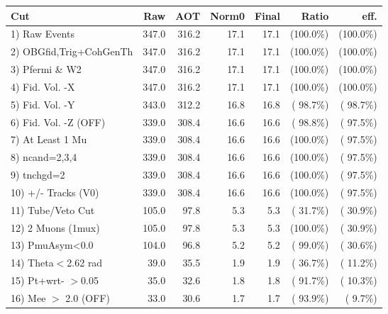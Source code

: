  \begin{table}[h!]\centering
 \begin{tabular}{||l||r|r|r|r|r|r||}
 \hline
 \hline
 Cut & Raw & AOT & Norm0 & Final & Ratio & eff.       \\
 \hline
  1) Raw Events           &        347.0 &        316.2 &         17.1 &         17.1 & (100.0\%) & (100.0\%) \\
  2) OBGfid,Trig+CohGenTh &        347.0 &        316.2 &         17.1 &         17.1 & (100.0\%) & (100.0\%) \\
  3) Pfermi \& W2         &        347.0 &        316.2 &         17.1 &         17.1 & (100.0\%) & (100.0\%) \\
  4) Fid. Vol. -X         &        347.0 &        316.2 &         17.1 &         17.1 & (100.0\%) & (100.0\%) \\
  5) Fid. Vol. -Y         &        343.0 &        312.2 &         16.8 &         16.8 & ( 98.7\%) & ( 98.7\%) \\
  6) Fid. Vol. -Z (OFF)   &        339.0 &        308.4 &         16.6 &         16.6 & ( 98.8\%) & ( 97.5\%) \\
  7) At Least 1 Mu        &        339.0 &        308.4 &         16.6 &         16.6 & (100.0\%) & ( 97.5\%) \\
  8) ncand=2,3,4          &        339.0 &        308.4 &         16.6 &         16.6 & (100.0\%) & ( 97.5\%) \\
  9) tnchgd=2             &        339.0 &        308.4 &         16.6 &         16.6 & (100.0\%) & ( 97.5\%) \\
 10) +/- Tracks (V0)      &        339.0 &        308.4 &         16.6 &         16.6 & (100.0\%) & ( 97.5\%) \\
 11) Tube/Veto Cut        &        105.0 &         97.8 &          5.3 &          5.3 & ( 31.7\%) & ( 30.9\%) \\
 12) 2 Muons (1mux)       &        105.0 &         97.8 &          5.3 &          5.3 & (100.0\%) & ( 30.9\%) \\
 13) PmuAsym<0.0          &        104.0 &         96.8 &          5.2 &          5.2 & ( 99.0\%) & ( 30.6\%) \\
 14) Theta$<$2.62 rad     &         39.0 &         35.5 &          1.9 &          1.9 & ( 36.7\%) & ( 11.2\%) \\
 15) Pt+wrt- $>$0.05      &         35.0 &         32.6 &          1.8 &          1.8 & ( 91.7\%) & ( 10.3\%) \\
 16) Mee $>$ 2.0  (OFF)   &         33.0 &         30.6 &          1.7 &          1.7 & ( 93.9\%) & (  9.7\%) \\

\end{tabular}
\end{table}
